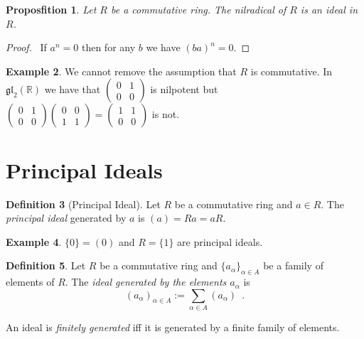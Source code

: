 \documentclass{book}
\let\qed\relax
\newtheorem{prop}{Proposfition}[chapter]
\theoremstyle{definition}
\newtheorem{df}[prop]{Definition}
\newtheorem{ex}[prop]{Example}
\newcommand{\gl}[2]{\ensuremath{\mathfrak{gl}_{#1} \left( {#2} \right)}}
\begin{document}
\begin{prop}
Let $R$ be a commutative ring. The nilradical of $R$ is an ideal in $R$.
\end{prop}

\begin{proof}
\pf\ If $a^n = 0$ then for any $b$ we have $(ba)^n = 0$. \qed
\end{proof}

\begin{ex}
We cannot remove the assumption that $R$ is commutative. In $\gl{2}{\mathbb{R}}$ we have that $\left( \begin{array}{cc} 0 & 1 \\ 0 & 0 \end{array} \right)$ is nilpotent but $\left( \begin{array}{cc} 0 & 1 \\ 0 & 0 \end{array} \right) \left( \begin{array}{cc} 0 & 0 \\ 1 & 1 \end{array} \right) = \left( \begin{array}{cc} 1 & 1 \\ 0 & 0 \end{array} \right)$ is not.
\end{ex}

\section{Principal Ideals}

\begin{df}[Principal Ideal]
Let $R$ be a commutative ring and $a \in R$. The \emph{principal ideal} generated by $a$ is $(a) = Ra = aR$.
\end{df}

\begin{ex}
$\{0\} = (0)$ and $R = \{1\}$ are principal ideals.
\end{ex}

\begin{df}
Let $R$ be a commutative ring and $\{a_\alpha\}_{\alpha \in A}$ be a family of elements of $R$. The \emph{ideal generated by the elements $a_\alpha$} is
\[ (a_\alpha)_{\alpha \in A} := \sum_{\alpha \in A} (a_\alpha) \enspace . \]

An ideal is \emph{finitely generated} iff it is generated by a finite family of elements.
\end{df}
\end{document}
